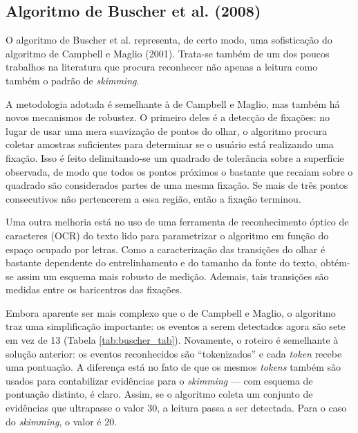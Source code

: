 \documentclass[12pt]{article}
\begin{document}
		\subsection{Algoritmo de Buscher et al. (2008)}
		O algoritmo de Buscher et al.\cite{Buscher-2008} representa, de certo modo, uma sofisticação do algoritmo de Campbell e Maglio (2001). Trata-se também de um dos poucos trabalhos na literatura que procura reconhecer não apenas a leitura como também o padrão de \textit{skimming}.
		
		A metodologia adotada é semelhante à de Campbell e Maglio, mas também há novos mecanismos de robustez. O primeiro deles é a detecção de fixações: no lugar de usar uma mera suavização de pontos do olhar, o algoritmo procura coletar amostras suficientes para determinar se o usuário está realizando uma fixação. Isso é feito delimitando-se um quadrado de tolerância sobre a superfície observada, de modo que todos os pontos próximos o bastante que recaiam sobre o quadrado são considerados partes de uma mesma fixação. Se mais de três pontos consecutivos não pertencerem a essa região, então a fixação terminou.
		
		Uma outra melhoria está no uso de uma ferramenta de reconhecimento óptico de caracteres (OCR) do texto lido para parametrizar o algoritmo em função do espaço ocupado por letras. Como a caracterização das transições do olhar é bastante dependente do entrelinhamento e do tamanho da fonte do texto, obtém-se assim um esquema mais robusto de medição. Ademais, tais transições são medidas entre os baricentros das fixações.
		
		Embora aparente ser mais complexo que o de Campbell e Maglio, o algoritmo traz uma simplificação importante: os eventos a serem detectados agora são sete em vez de 13 (Tabela \ref{tab:buscher_tab}). Novamente, o roteiro é semelhante à solução anterior: os eventos reconhecidos são ``tokenizados'' e cada \textit{token} recebe uma pontuação. A diferença está no fato de que os mesmos \textit{tokens} também são usados para contabilizar evidências para o \textit{skimming} --- com esquema de pontuação distinto, é claro. Assim, se o algoritmo coleta um conjunto de evidências que ultrapasse o valor 30, a leitura passa a ser detectada. Para o caso do \textit{skimming}, o valor é 20. 
		
\end{document}
